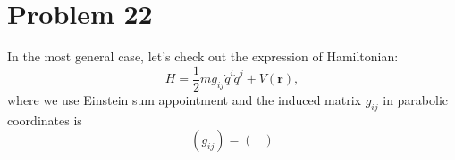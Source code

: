 \section*{Problem 22}

In the most general case, let's check out the expression of Hamiltonian:
\begin{equation}
    H = \frac{1}{2} m g_{ij} \dot{q}^i \dot{q}^j  +  V\left(\boldsymbol{r}\right),
\end{equation}
where we use Einstein sum appointment and the induced matrix $g_{ij}$ in parabolic coordinates is
\begin{equation}
    \left(g_{ij}\right)  = \left(
    \begin{matrix}
        
    \end{matrix}
    \right)
\end{equation}